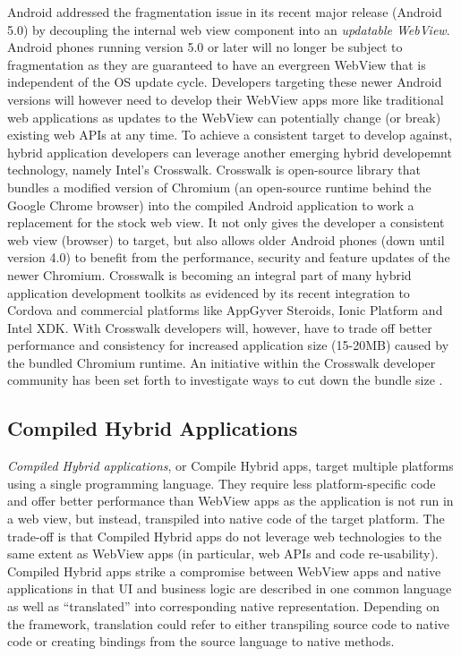 \documentclass[thesis.tex]{subfiles}
\begin{document}
Android addressed the fragmentation issue in its recent major release (Android 5.0) by decoupling the internal web view component into an \textit{updatable WebView}. Android phones running version 5.0 or later will no longer be subject to fragmentation as they are guaranteed to have an evergreen WebView that is independent of the OS update cycle. Developers targeting these newer Android  versions will however need to develop their WebView apps more like traditional web applications as updates to the WebView can potentially change (or break) existing web APIs at any time. To achieve a consistent target to develop against, hybrid application developers can leverage another emerging hybrid developemnt technology, namely Intel's Crosswalk. Crosswalk is open-source library that bundles a modified version of Chromium (an open-source runtime behind the Google Chrome browser) into the compiled Android application to work a replacement for the stock web view. It not only gives the developer a consistent web view (browser) to target, but also allows older Android phones (down until version 4.0) to benefit from the performance, security and feature updates of the newer Chromium. Crosswalk is becoming an integral part of many hybrid application development toolkits as evidenced by its recent integration to Cordova and commercial platforms like AppGyver Steroids, Ionic Platform and Intel XDK. With Crosswalk developers will, however, have to trade off better performance and consistency for increased application size (15-20MB) caused by the bundled Chromium runtime. An initiative within the Crosswalk developer community has been set forth to investigate ways to cut down the bundle size \cite{crosswalk_lite}.

\subsection{Compiled Hybrid Applications}

\textit{Compiled Hybrid applications}, or Compile Hybrid apps, target multiple platforms using a single programming language. They require less platform-specific code and offer better performance than WebView apps as the application is not run in a web view, but instead, transpiled into native code of the target platform. The trade-off is that Compiled Hybrid apps do not leverage web technologies to the same extent as WebView apps (in particular, web APIs and code re-usability). Compiled Hybrid apps strike a compromise between WebView apps and native applications in that UI and business logic are described in one common language as well as ``translated'' into corresponding native representation. Depending on the framework, translation could refer to either transpiling source code to native code or creating bindings from the source language to native methods.
\end{document}

